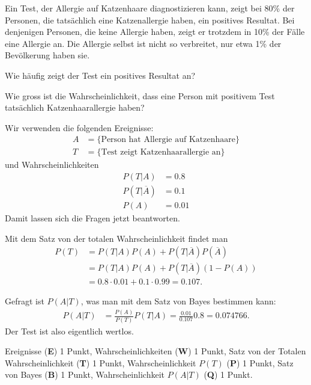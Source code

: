 Ein Test, der Allergie auf Katzenhaare diagnostizieren kann, 
zeigt bei 80\% der Personen, die tatsächlich eine Katzenallergie haben,
ein positives Resultat.
Bei denjenigen Personen, die keine Allergie haben, zeigt er trotzdem
in 10\% der Fälle eine Allergie an.
Die Allergie selbst ist nicht so verbreitet, nur etwa 1\% der Bevölkerung
haben sie.
\begin{teilaufgaben}
\item
Wie häufig zeigt der Test ein positives Resultat an?
\item
Wie gross ist die Wahrscheinlichkeit, dass eine Person mit positivem
Test tatsächlich Katzenhaarallergie haben?
\end{teilaufgaben}


\begin{loesung}
Wir verwenden die folgenden Ereignisse:
\begin{align*}
A&=\{\text{Person hat Allergie auf Katzenhaare}\}
\\
T&=\{\text{Test zeigt Katzenhaarallergie an}\}
\end{align*}
und Wahrscheinlichkeiten
\begin{align*}
P(T|A)&=0.8\\
P(T|\overline{A})&=0.1\\
P(A)&=0.01
\end{align*}
Damit lassen sich die Fragen jetzt beantworten.
\begin{teilaufgaben}
\item
Mit dem Satz von der totalen Wahrscheinlichkeit findet man
\begin{align*}
P(T) 
&=
P(T|A)P(A) + P(T|\overline{A}) P(\overline{A})
\\
&=
P(T|A)P(A) + P(T|\overline{A}) (1-P(A))
\\
&=
0.8\cdot 0.01 + 0.1 \cdot 0.99
= 0.107.
\end{align*}
\item
Gefragt ist $P(A|T)$, was man mit dem 
Satz von Bayes bestimmen kann:
\begin{align*}
P(A|T)
&=
\frac{P(A)}{P(T)}P(T|A)
=
\frac{0.01}{0.107} 0.8
=
0.074766.
\end{align*}
Der Test ist also eigentlich wertlos.
\qedhere
\end{teilaufgaben}
\end{loesung}

\begin{bewertung}
Ereignisse ({\bf E}) 1 Punkt,
Wahrscheinlichkeiten ({\bf W}) 1 Punkt,
Satz von der Totalen Wahrscheinlichkeit ({\bf T}) 1 Punkt,
Wahrscheinlichkeit $P(T)$ ({\bf P}) 1 Punkt,
Satz von Bayes ({\bf B}) 1 Punkt,
Wahrscheinlichkeit $P(A|T)$ ({\bf Q}) 1 Punkt.
\end{bewertung}

